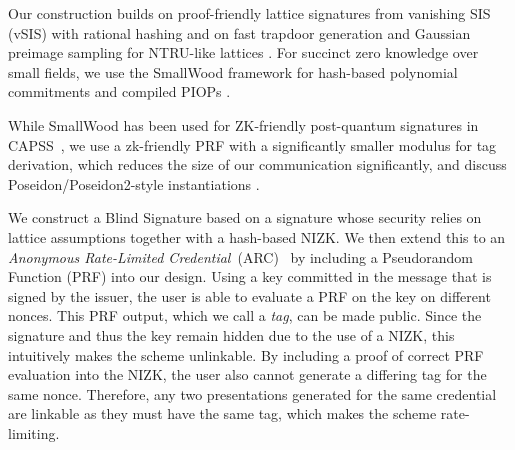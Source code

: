 Our construction builds on proof-friendly lattice signatures from vanishing SIS (vSIS) with rational hashing
\cite{EPRINT:DKLW25,PKC:DKLW25} and on fast trapdoor generation and Gaussian preimage sampling for NTRU-like
lattices \cite{EPRINT:ENSTW23}. For succinct zero knowledge over small fields, we use the SmallWood framework
for hash-based polynomial commitments and compiled PIOPs \cite{EPRINT:FenRiv25b}.

While SmallWood has been used for ZK-friendly post-quantum signatures in CAPSS~\cite{EPRINT:FenRiv25a}, we use a zk-friendly PRF with a significantly smaller modulus for tag derivation, which reduces the size of our communication significantly, and discuss Poseidon/Poseidon2-style instantiations \cite{USENIX:GKRRS21,AFRICACRYPT:GraKhoSch23}.

We construct a Blind Signature based on a signature whose security relies on lattice assumptions together with
a hash-based NIZK. We then extend this to an \emph{Anonymous Rate-Limited Credential}~(ARC)~\cite{ietf-privacypass-arc-protocol-01}
by including a Pseudorandom Function (PRF) into our design. Using a key committed in the message that is signed by the
issuer, the user is able to evaluate a PRF on the key on different nonces. This PRF output, which we call a
\emph{tag}, can be made public. Since the signature and thus the key remain hidden due to the use of a NIZK, this
intuitively makes the scheme unlinkable. By including a proof of correct PRF evaluation into the NIZK, the user also
cannot generate a differing tag for the same nonce. Therefore, any two presentations generated for the same credential
are linkable as they must have the same tag, which makes the scheme rate-limiting.

